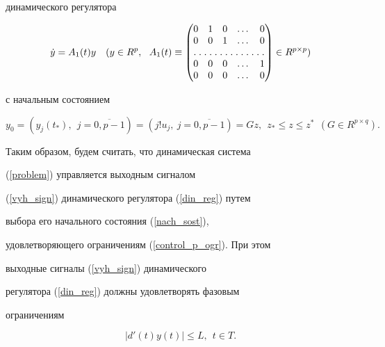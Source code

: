 динамического регулятора


\begin{equation}\label{din_reg}


\Dot{y} = A_1(t) y \quad (y \in R^p, \ \ A_1(t) \equiv


\begin{pmatrix}


0 & 1 & 0 & \dotsc & 0 \\


0 & 0 & 1 & \dotsc & 0 \\


\hdotsfor[1.5]{5}\\


0 & 0 & 0 & \dotsc & 1 \\


0 & 0 & 0 & \dotsc & 0 \\


\end{pmatrix} \in R^{p \times p} )


\end{equation}


с начальным состоянием


\begin{equation}\label{nach_sost}


y_0 = (y_j(t_*), \ \ j=\overline{0,p-1}) = (j! u_j, \


j=\overline{0,p-1}) = Gz, \ \ z_* \leq z \leq z^* \ \ (G \in R^{p


\times q}).


\end{equation}





Таким образом, будем считать, что динамическая система


(\ref{problem}) управляется выходным сигналом


(\ref{vyh_sign}) динамического регулятора (\ref{din_reg}) путем


выбора его начального состояния (\ref{nach_sost}),


удовлетворяющего ограничениям (\ref{control_p_ogr}). При этом


выходные сигналы (\ref{vyh_sign}) динамического


регулятора (\ref{din_reg}) должны удовлетворять фазовым


ограничениям


\begin{equation}\label{faz_ogr}


|d'(t)y(t)| \leq L, \ \ t \in T.


\end{equation}






